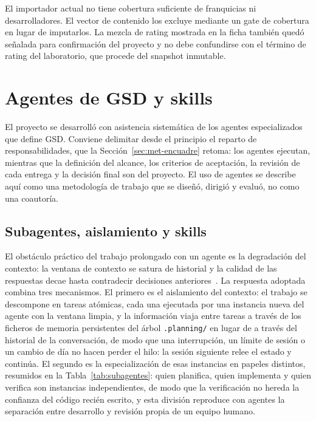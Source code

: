 El importador actual no tiene cobertura suficiente de franquicias ni desarrolladores. El
vector de contenido los excluye mediante un gate de cobertura en lugar de imputarlos. La
mezcla de rating mostrada en la ficha también quedó señalada para confirmación del proyecto y
no debe confundirse con el término de rating del laboratorio, que procede del snapshot
inmutable.

\section{Agentes de GSD y skills}\label{sec:met-agentes}

El proyecto se desarrolló con asistencia sistemática de los agentes especializados que define
GSD. Conviene delimitar desde el principio el reparto de responsabilidades, que la
Sección~\ref{sec:met-encuadre} retoma: los agentes ejecutan, mientras que la definición del
alcance, los criterios de aceptación, la revisión de cada entrega y la decisión final son
del proyecto. El uso de agentes se describe aquí como una metodología de trabajo que se
diseñó, dirigió y evaluó, no como una coautoría.

\subsection{Subagentes, aislamiento y skills}\label{sec:met-subagentes}

El obstáculo práctico del trabajo prolongado con un agente es la degradación del contexto: la
ventana de contexto se satura de historial y la calidad de las respuestas decae hasta
contradecir decisiones anteriores~\cite{anthropic-context}. La respuesta adoptada combina tres
mecanismos. El primero es el aislamiento del contexto: el trabajo se descompone en tareas
atómicas, cada una ejecutada por una instancia nueva del agente con la ventana limpia, y la
información viaja entre tareas a través de los ficheros de memoria persistentes del árbol
\texttt{.planning/} en lugar de a través del historial de la conversación, de modo que una
interrupción, un límite de sesión o un cambio de día no hacen perder el hilo: la sesión
siguiente relee el estado y continúa. El segundo es la especialización de esas instancias en
papeles distintos, resumidos en la Tabla~\ref{tab:subagentes}: quien planifica, quien implementa
y quien verifica son instancias independientes, de modo que la verificación no hereda la
confianza del código recién escrito, y esta división reproduce con agentes la separación entre
desarrollo y revisión propia de un equipo humano.

